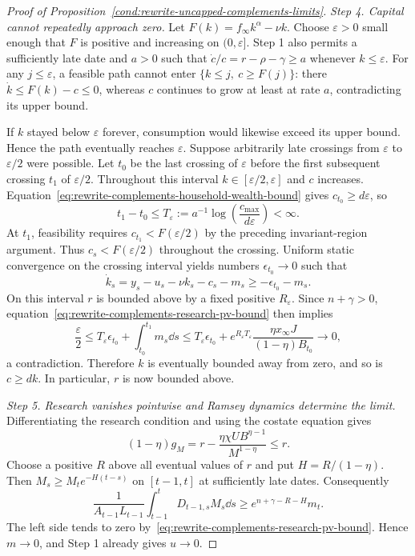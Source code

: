 \begin{proof}[Proof of Proposition~\ref{cond:rewrite-uncapped-complements-limits}]
\textit{Step 4. Capital cannot repeatedly approach zero.}
Let $F(k)=f_\infty k^\alpha-\nu k$.
Choose $\varepsilon>0$ small enough that $F$ is positive and increasing on
$(0,\varepsilon]$. Step 1 also permits a sufficiently late date and
$a>0$ such that $\dot c/c=r-\rho-\gamma\geq a$ whenever $k\leq\varepsilon$.
For any $j\leq\varepsilon$, a feasible path cannot enter
$\{k\leq j,\ c\geq F(j)\}$: there $\dot k\leq F(k)-c\leq0$,
whereas $c$ continues to grow at least at rate $a$, contradicting its upper bound.

If $k$ stayed below $\varepsilon$ forever, consumption would likewise
exceed its upper bound. Hence the path eventually reaches $\varepsilon$.
Suppose arbitrarily late crossings from $\varepsilon$ to $\varepsilon/2$
were possible. Let $t_0$ be the last crossing of $\varepsilon$ before the
first subsequent crossing $t_1$ of $\varepsilon/2$.
Throughout this interval $k\in[\varepsilon/2,\varepsilon]$ and $c$ increases.
Equation~\eqref{eq:rewrite-complements-household-wealth-bound} gives
$c_{t_0}\geq d\varepsilon$, so
\[
 t_1-t_0\leq T_\varepsilon
 :=a^{-1}\log\!\left(\frac{c_{\max}}{d\varepsilon}\right)<\infty.
\]
At $t_1$, feasibility requires $c_{t_1}<F(\varepsilon/2)$ by the preceding
invariant-region argument. Thus $c_s<F(\varepsilon/2)$ throughout the crossing.
Uniform static convergence on the crossing interval yields numbers
$\epsilon_{t_0}\to0$ such that
\[
 \dot k_s
 =y_s-u_s-\nu k_s-c_s-m_s
 \geq-\epsilon_{t_0}-m_s.
\]
On this interval $r$ is bounded above by a fixed positive $R_\varepsilon$.
Since $n+\gamma>0$, equation~\eqref{eq:rewrite-complements-research-pv-bound}
then implies
\[
 \frac{\varepsilon}{2}
 \leq T_\varepsilon\epsilon_{t_0}+\int_{t_0}^{t_1}m_s\dd s
 \leq T_\varepsilon\epsilon_{t_0}
 +e^{R_\varepsilon T_\varepsilon}
   \frac{\eta x_\infty J}{(1-\eta)B_{t_0}}
 \longrightarrow0,
\]
a contradiction. Therefore $k$ is eventually bounded away from zero,
and so is $c\geq dk$. In particular, $r$ is now bounded above.

\textit{Step 5. Research vanishes pointwise and Ramsey dynamics determine the limit.}
Differentiating the research condition and using the costate equation gives
\begin{equation}
 (1-\eta)g_M
 =r-\frac{\eta\chi UB^{\eta-1}}{M^{1-\eta}}\leq r.
 \label{eq:rewrite-complements-research-growth-bound}
\end{equation}
Choose a positive $R$ above all eventual values of $r$ and put $H=R/(1-\eta)$.
Then $M_s\geq M_t e^{-H(t-s)}$ on $[t-1,t]$ at sufficiently late dates.
Consequently
\[
 \frac1{A_{t-1}L_{t-1}}
 \int_{t-1}^t D_{t-1,s}M_s\dd s
 \geq e^{n+\gamma-R-H}m_t.
\]
The left side tends to zero by~\eqref{eq:rewrite-complements-research-pv-bound}.
Hence $m\to0$, and Step 1 already gives $u\to0$.


\end{proof}
